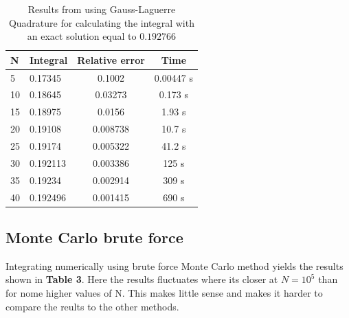 \documentclass[twoside,twocolumn]{article}
\begin{document}
\begin{table}[h]
\centering
\begin{tabular}{|l|l|c|c|}
\hline
N  & Integral & \multicolumn{1}{l|}{Relative error} & Time      \\ \hline
5  & 0.17345  & 0.1002                              & 0.00447 s \\ \hline
10 & 0.18645  & 0.03273                             & 0.173 s   \\ \hline
15 & 0.18975  & 0.0156                              & 1.93 s    \\ \hline
20 & 0.19108  & 0.008738                            & 10.7 s    \\ \hline
25 & 0.19174  & 0.005322                            & 41.2 s    \\ \hline
30 & 0.192113 & 0.003386                            & 125 s     \\ \hline
35 & 0.19234& 0.002914                           & 309 s     \\ \hline
40 & 0.192496 & 0.001415                             & 690 s     \\ \hline
\end{tabular}
\caption{Results from using Gauss-Laguerre Quadrature for calculating the integral with an exact solution equal to $0.192766$}
\end{table}
\subsection{Monte Carlo brute force}
Integrating numerically using brute force Monte Carlo method yields the results shown in \textbf{Table 3}. Here the results fluctuates where its closer at $N = 10^5$ than for nome higher values of N. This makes little sense and makes it harder to compare the reults to the other methods. 
\end{document}
